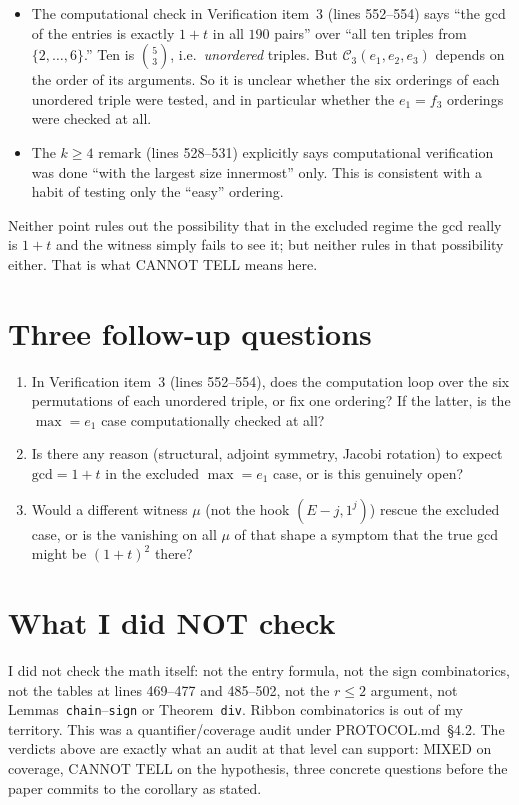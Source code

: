 \documentclass[11pt]{amsart}
\newcommand{\Ck}{\mathcal{C}}
\begin{document}
\begin{itemize}[leftmargin=1.5em]
    \item The computational check in Verification item~3 (lines 552--554)
    says ``the gcd of the entries is exactly $1+t$ in all $190$ pairs''
    over ``all ten triples from $\{2,\ldots,6\}$.'' Ten is
    $\binom{5}{3}$, i.e.\ \emph{unordered} triples. But
    $\Ck_3(e_1, e_2, e_3)$ depends on the order of its arguments. So
    it is unclear whether the six orderings of each unordered triple
    were tested, and in particular whether the $e_1 = f_3$ orderings
    were checked at all.
    \item The $k \ge 4$ remark (lines 528--531) explicitly says
    computational verification was done ``with the largest size innermost''
    only. This is consistent with a habit of testing only the ``easy''
    ordering.
\end{itemize}

Neither point rules out the possibility that in the excluded regime the
gcd really is $1+t$ and the witness simply fails to see it; but neither
rules in that possibility either. That is what CANNOT TELL means here.

\section{Three follow-up questions}

\begin{enumerate}[leftmargin=2em, label=\arabic*.]
    \item In Verification item~3 (lines 552--554), does the computation loop
    over the six permutations of each unordered triple, or fix one
    ordering? If the latter, is the $\max = e_1$ case computationally
    checked at all?
    \item Is there any reason (structural, adjoint symmetry, Jacobi
    rotation) to expect $\text{gcd} = 1+t$ in the excluded $\max = e_1$
    case, or is this genuinely open?
    \item Would a different witness $\mu$ (not the hook $(E-j, 1^j)$)
    rescue the excluded case, or is the vanishing on all $\mu$ of that
    shape a symptom that the true gcd might be $(1+t)^2$ there?
\end{enumerate}

\section{What I did NOT check}

I did not check the math itself: not the entry formula, not the sign
combinatorics, not the tables at lines 469--477 and 485--502, not the
$r \le 2$ argument, not Lemmas~\texttt{chain}--\texttt{sign} or
Theorem~\texttt{div}. Ribbon combinatorics is out of my territory. This
was a quantifier/coverage audit under PROTOCOL.md~\S4.2. The verdicts
above are exactly what an audit at that level can support: MIXED on
coverage, CANNOT TELL on the hypothesis, three concrete questions before
the paper commits to the corollary as stated.
\end{document}
